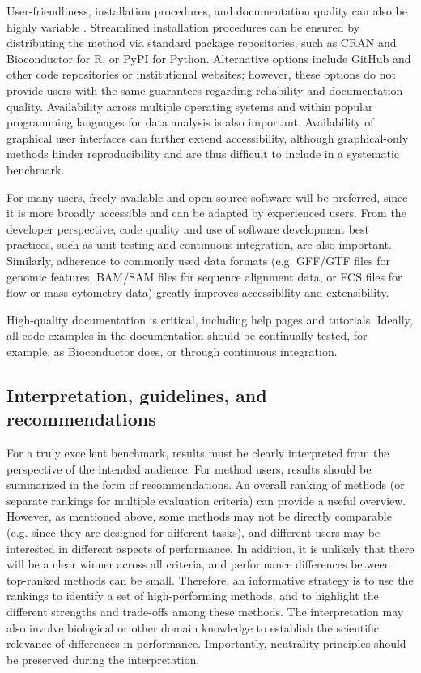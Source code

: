 User-friendliness, installation procedures, and documentation quality can also be highly variable \cite{mangul_improvingusabilityarchival_2019,mangul_challengesrecommendationsimprove_2019}. Streamlined installation procedures can be ensured by distributing the method via standard package repositories, such as CRAN and Bioconductor for R, or PyPI for Python. Alternative options include GitHub and other code repositories or institutional websites; however, these options do not provide users with the same guarantees regarding reliability and documentation quality. Availability across multiple operating systems and within popular programming languages for data analysis is also important. Availability of graphical user interfaces can further extend accessibility, although graphical-only methods hinder reproducibility and are thus difficult to include in a systematic benchmark.

For many users, freely available and open source software will be preferred, since it is more broadly accessible and can be adapted by experienced users. From the developer perspective, code quality and use of software development best practices, such as unit testing and continuous integration, are also important. Similarly, adherence to commonly used data formats (e.g. GFF/GTF files for genomic features, BAM/SAM files for sequence alignment data, or FCS files for flow or mass cytometry data) greatly improves accessibility and extensibility.

High-quality documentation is critical, including help pages and tutorials. Ideally, all code examples in the documentation should be continually tested, for example, as Bioconductor does, or through continuous integration.

\subsection{Interpretation, guidelines, and recommendations}

For a truly excellent benchmark, results must be clearly interpreted from the perspective of the intended audience. For method users, results should be summarized in the form of recommendations. An overall ranking of methods (or separate rankings for multiple evaluation criteria) can provide a useful overview. However, as mentioned above, some methods may not be directly comparable (e.g. since they are designed for different tasks), and different users may be interested in different aspects of performance. In addition, it is unlikely that there will be a clear winner across all criteria, and performance differences between top-ranked methods can be small. Therefore, an informative strategy is to use the rankings to identify a set of high-performing methods, and to highlight the different strengths and trade-offs among these methods. The interpretation may also involve biological or other domain knowledge to establish the scientific relevance of differences in performance. Importantly, neutrality principles should be preserved during the interpretation.

